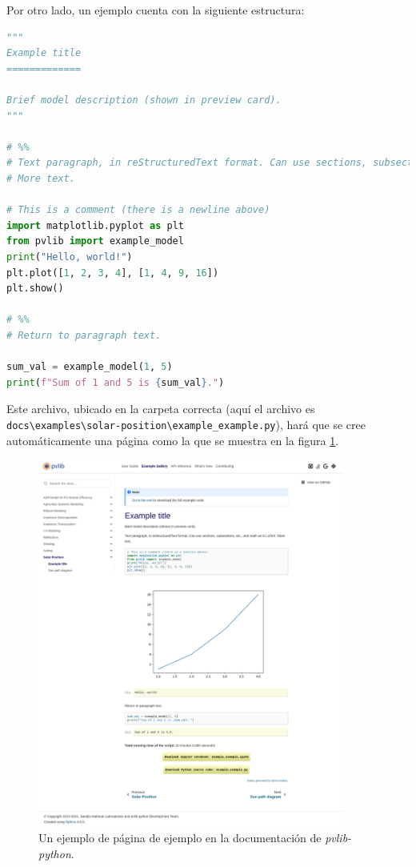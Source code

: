 Por otro lado, un ejemplo cuenta con la siguiente estructura:

\begin{lstlisting}[language=Python, caption={Plantilla para elaborar un ejemplo en \textit{pvlib-python}.}, label={lst:doc_example_example}]
"""
Example title
=============

Brief model description (shown in preview card).
"""

# %%
# Text paragraph, in reStructuredText format. Can use sections, subsections, etc., and math as in LaTeX.
# More text.

# This is a comment (there is a newline above)
import matplotlib.pyplot as plt
from pvlib import example_model
print("Hello, world!")
plt.plot([1, 2, 3, 4], [1, 4, 9, 16])
plt.show()

# %%
# Return to paragraph text.

sum_val = example_model(1, 5)
print(f"Sum of 1 and 5 is {sum_val}.")
\end{lstlisting}

Este archivo, ubicado en la carpeta correcta (aquí el archivo es \lstinline{docs\examples\solar-position\example_example.py}), hará que se cree automáticamente una página como la que se muestra en la figura \ref{fig:doc_use_example}.

\begin{figure}[H]
    \centering
    \includegraphics[width=0.9\textwidth]{./images/doc_example/example_stretch.png}
    \caption{Un ejemplo de página de ejemplo en la documentación de \textit{pvlib-python}.}
    \label{fig:doc_use_example}
\end{figure}

